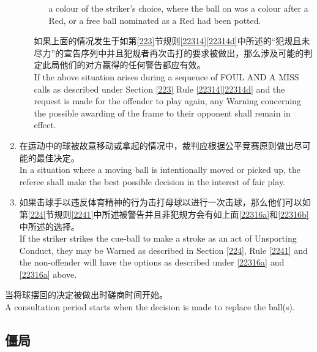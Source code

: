 \begin{enumerate}[label=(\alph*)]
\begin{enumerate}[label=(\roman*)]
\begin{enumerate}[label=(\roman*)]
            a colour of the striker's choice, where the ball on was a colour after a Red, or a free ball nominated as a Red had been potted.
        \end{enumerate}
        如果上面的情况发生于如第\ref{223}节规则\ref{22314}\ref{22314d}中所述的``犯规且未尽力''的宣告序列中并且犯规者再次击打的要求被做出，那么涉及可能的判定此局他们的对方赢得的任何警告都应有效。\\
        If the above situation arises during a sequence of FOUL AND A MISS calls as described under Section \ref{223} Rule \ref{22314}\ref{22314d} and the request is made for the offender to play again, any Warning concerning the possible awarding of the frame to their opponent shall remain in effect.
    \end{enumerate}
    \item \label{22316b}在运动中的球被故意移动或拿起的情况中，裁判应根据公平竞赛原则做出尽可能的最佳决定。\\
    In a situation where a moving ball is intentionally moved or picked up, the referee shall make the best possible decision in the interest of fair play.
    \item 如果击球手以违反体育精神的行为击打母球以进行一次击球，那么他们可以如第\ref{224}节规则\ref{2241}中所述被警告并且非犯规方会有如上面\ref{22316a}和\ref{22316b}中所述的选择。\\
    If the striker strikes the cue-ball to make a stroke as an act of Unsporting Conduct, they may be Warned as described in Section \ref{224}, Rule \ref{2241} and the non-offender will have the options as described under \ref{22316a} and \ref{22316a} above.
\end{enumerate}
\noindent 当将球摆回的决定被做出时磋商时间开始。\\
A consultation period starts when the decision is made to replace the ball(s).

\subsection{僵局}\label{22317}

